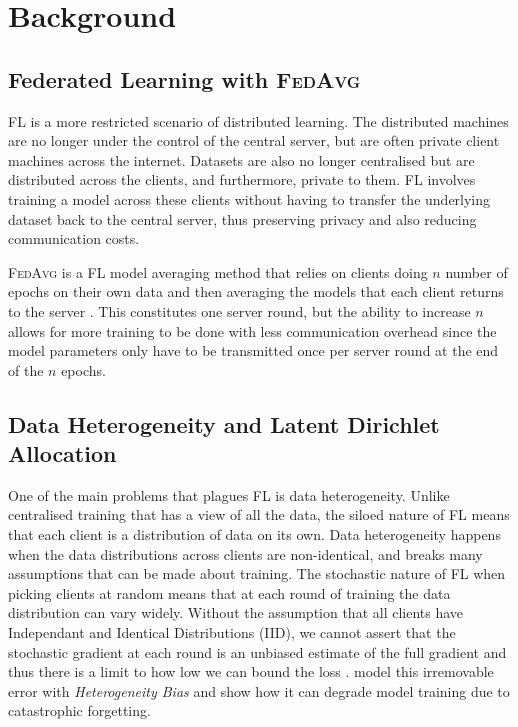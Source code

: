 \documentclass{article}
\newcommand*{\fedavg}{\textsc{FedAvg}}
\begin{document}
\section{Background}
\subsection{Federated Learning with \fedavg}
FL is a more restricted scenario of distributed learning. The distributed machines are no longer under the control of the central server, but are often private client machines across the internet. Datasets are also no longer centralised but are distributed across the clients, and furthermore, private to them. FL involves training a model across these clients without having to transfer the underlying dataset back to the central server, thus preserving privacy and also reducing communication costs.

\fedavg{} is a FL model averaging method that relies on clients doing $n$ number of epochs on their own data and then averaging the models that each client returns to the server \cite{mcmahanCommunicationEfficientLearningDeep2017}. This constitutes one server round, but the ability to increase $n$ allows for more training to be done with less communication overhead since the model parameters only have to be transmitted once per server round at the end of the $n$ epochs.

\subsection{Data Heterogeneity and Latent Dirichlet Allocation}
One of the main problems that plagues FL is data heterogeneity. Unlike centralised training that has a view of all the data, the siloed nature of FL means that each client is a distribution of data on its own. Data heterogeneity happens when the data distributions across clients are non-identical, and breaks many assumptions that can be made about training. The stochastic nature of FL when picking clients at random means that at each round of training the data distribution can vary widely. Without the assumption that all clients have Independant and Identical Distributions (IID), we cannot assert that the stochastic gradient at each round is an unbiased estimate of the full gradient \cite{zhaoFederatedLearningNonIID2018} and thus there is a limit to how low we can bound the loss \cite{karimireddySCAFFOLDStochasticControlled2021}. \citet{zhouUnderstandingImprovingModel2023} model this irremovable error with \emph{Heterogeneity Bias} and show how it can degrade model training due to catastrophic forgetting.
\end{document}
